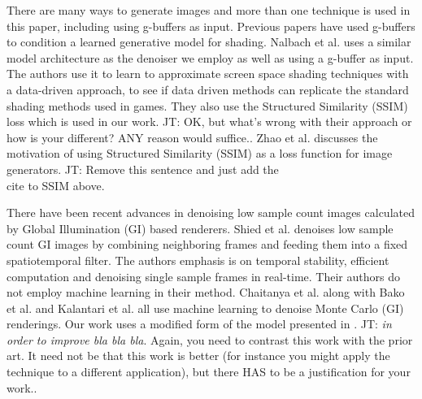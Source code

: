 \documentclass[10pt,twocolumn,letterpaper]{article}
\newcommand{\tompson}[1]{{\color{green} JT: #1}}
\begin{document}
There are many ways to generate images and more than one technique is used in this paper, including using g-buffers as input. Previous papers have used g-buffers to condition a learned generative model for shading. Nalbach et al. \cite{DBLP:journals/corr/NalbachAMSR16} uses a similar model architecture as the denoiser we employ as well as using a g-buffer as input. The authors use it to learn to approximate screen space shading techniques with a data-driven approach, to see if data driven methods can replicate the standard shading methods used in games.  They also use the Structured Similarity (SSIM) loss which is used in our work. \tompson{OK, but what's wrong with their approach or how is your different? ANY reason would suffice.}.
Zhao et al. \cite{DBLP:journals/corr/ZhaoGFK15} discusses the motivation of using Structured Similarity (SSIM) as a loss function for image generators. \tompson{Remove this sentence and just add the \\cite to SSIM above.}


There have been recent advances in denoising low sample count images calculated by Global Illumination (GI) based renderers.
Shied et al. \cite{Schied:2017:SVF:3105762.3105770} denoises low sample count GI images by combining neighboring frames and feeding them into a fixed spatiotemporal filter.  The authors emphasis is on temporal stability, efficient computation and denoising single sample frames in real-time. Their authors do not employ machine learning in their method. 
Chaitanya et al. \cite{Chaitanya:2017:IRM:3072959.3073601} along with 
Bako et al. \cite{Bako17} and 
Kalantari et al. \cite{Kalantari:2015:MLA:2809654.2766977} all use machine learning to denoise Monte Carlo (GI) renderings.  Our work uses a modified form of the model presented in \cite{Chaitanya:2017:IRM:3072959.3073601}. \tompson{\textit{in order to improve bla bla bla}. Again, you need to contrast this work with the prior art. It need not be that this work is better (for instance you might apply the technique to a different application), but there HAS to be a justification for your work.}.
\end{document}
